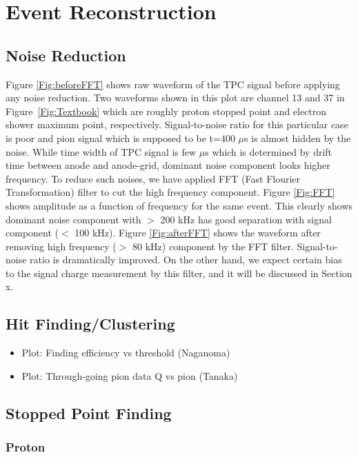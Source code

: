 \documentclass{cernyrep}
\begin{document}
\section{Event Reconstruction}
\subsection{Noise Reduction}

Figure \ref{Fig:beforeFFT} shows raw waveform of the TPC signal
before applying any noise reduction. Two waveforms shown in this plot
are channel 13 and 37 in Figure~\ref{Fig:Textbook} which are roughly
proton stopped point and electron shower maximum point, respectively.
Signal-to-noise ratio for this particular case is poor and pion signal 
which is supposed to be t=400 $\mu$s is almost hidden by the noise. 
While time width of TPC signal is few $\mu$s which is determined by
drift time between anode and anode-grid, dominant noise component looks
higher frequency. To reduce such noises, we have applied FFT 
(Fast Flourier Transformation) filter to cut the high frequency component.
Figure \ref{Fig:FFT} shows amplitude as a function of frequency
for the same event. This clearly shows dominant noise component with
$>$ 200 kHz has good separation with signal component ($<$ 100 kHz).
Figure \ref{Fig:afterFFT} shows the waveform after removing high frequency
($>$ 80 kHz) component by the FFT filter. Signal-to-noise ratio is dramatically
improved. On the other hand, we expect certain bias to the signal charge
measurement by this filter, and it will be discussed in Section x.

\subsection{Hit Finding/Clustering}
\begin{itemize}
\item Plot: Finding efficiency vs threshold (Naganoma)
\item Plot: Through-going pion data Q vs pion (Tanaka)
\end{itemize}



\subsection{Stopped Point Finding}
\subsubsection{Proton}
\end{document}
